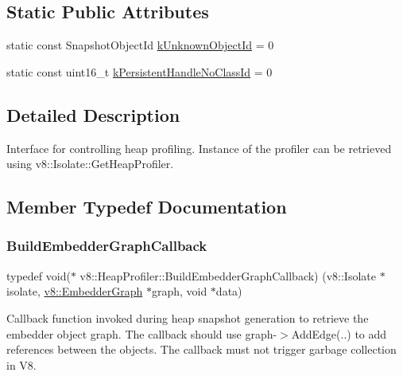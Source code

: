 \subsection*{Static Public Attributes}
\begin{DoxyCompactItemize}
\item 
static const Snapshot\+Object\+Id \mbox{\hyperlink{classv8_1_1HeapProfiler_abf2b9d8facb18473f9b124ab8baf5786}{k\+Unknown\+Object\+Id}} = 0
\item 
static const uint16\+\_\+t \mbox{\hyperlink{classv8_1_1HeapProfiler_a272c9af3ea5cd90a2737af3d22a7eb78}{k\+Persistent\+Handle\+No\+Class\+Id}} = 0
\end{DoxyCompactItemize}


\subsection{Detailed Description}
Interface for controlling heap profiling. Instance of the profiler can be retrieved using v8\+::\+Isolate\+::\+Get\+Heap\+Profiler. 

\subsection{Member Typedef Documentation}
\mbox{\label{classv8_1_1HeapProfiler_a29c98afa5ce0ea543eef904201bc3e40}} 
\subsubsection{\texorpdfstring{Build\+Embedder\+Graph\+Callback}{BuildEmbedderGraphCallback}}
{\footnotesize\ttfamily typedef void($\ast$ v8\+::\+Heap\+Profiler\+::\+Build\+Embedder\+Graph\+Callback) (v8\+::\+Isolate $\ast$isolate, \mbox{\hyperlink{classv8_1_1EmbedderGraph}{v8\+::\+Embedder\+Graph}} $\ast$graph, void $\ast$data)}

Callback function invoked during heap snapshot generation to retrieve the embedder object graph. The callback should use graph-\/$>$Add\+Edge(..) to add references between the objects. The callback must not trigger garbage collection in V8. \mbox{\label{classv8_1_1HeapProfiler_a7f34c8eb67f9502e5778695187ea0e96}} 
